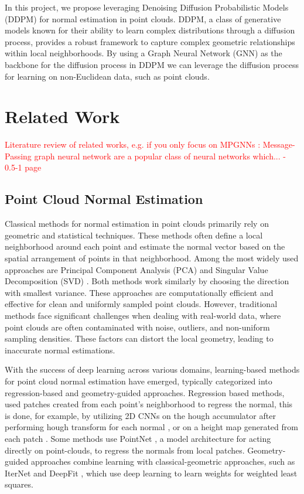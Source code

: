 \documentclass{acmart}
\newcommand{\instructions}[1]{\textcolor{red}{#1}\newline}
\begin{document}
In this project, we propose leveraging Denoising Diffusion Probabilistic Models (DDPM) \cite{ho2020denoising} for normal estimation in point clouds. DDPM, a class of generative models known for their ability to learn complex distributions through a diffusion process, provides a robust framework to capture complex geometric relationships within local neighborhoods. By using a Graph Neural Network (GNN) as the backbone for the diffusion process in DDPM we can leverage the diffusion process for learning on non-Euclidean data, such as point clouds.

\section{Related Work}
\instructions{Literature review of related works, e.g. if you only focus on MPGNNs : Message-Passing graph neural network are a popular class of neural networks which...\cite{morris2021weisfeiler} - 0.5-1 page}
\subsection{Point Cloud Normal Estimation}
Classical methods for normal estimation in point clouds primarily rely on geometric and statistical techniques. These methods often define a local neighborhood around each point and estimate the normal vector based on the spatial arrangement of points in that neighborhood. Among the most widely used approaches are Principal Component Analysis (PCA) \cite{hoppe1992surface} and Singular Value Decomposition (SVD) \cite{pauly2002efficient}.
Both methods work similarly by choosing the direction with smallest variance. These approaches are computationally efficient and effective for clean and uniformly sampled point clouds.
However, traditional methods face significant challenges when dealing with real-world data, where point clouds are often contaminated with noise, outliers, and non-uniform sampling densities. These factors can distort the local geometry, leading to inaccurate normal estimations.

With the success of deep learning across various domains, learning-based methods for point cloud normal estimation have emerged, typically categorized into regression-based and geometry-guided approaches.
Regression based methods, used patches created from each point's neighborhood to regress the normal, this is done, for example, by utilizing 2D CNNs on the hough accumulator after performing hough transform for each normal \cite{boulch2016deep}, or on a height map generated from each patch \cite{roveri2018pointpronets,zhou2022refine}. Some methods \cite{guerrero2018pcpnet,sharma2021point} use PointNet \cite{qi2017pointnet}, a model architecture for acting directly on point-clouds, to regress the normals from local patches. Geometry-guided approaches combine learning with classical-geometric approaches, such as IterNet \cite{lenssen2020deep} and DeepFit \cite{ben2020deepfit}, which use deep learning to learn weights for weighted least squares.
\end{document}
